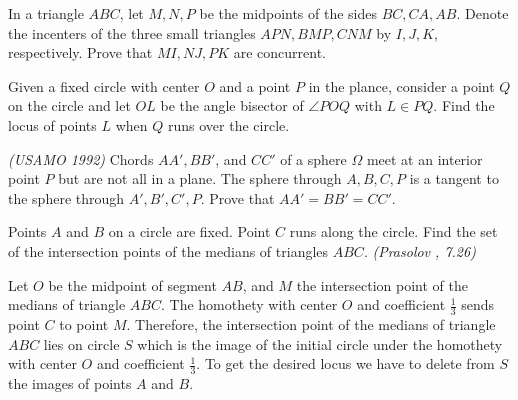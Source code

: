 \documentclass[11pt,twoside]{scrartcl}
\begin{document}
\begin{problem}
    In a triangle $ABC$, let $M, N, P$ be the midpoints of the sides $BC, CA, AB$. Denote the incenters of the three small triangles $APN, BMP, CNM$ by $I, J, K$, respectively. Prove that $MI, NJ, PK$ are concurrent.
    \begin{sketch}
        \TBD 
    \end{sketch}
\end{problem}

\begin{problem}
    Given a fixed circle with center $O$ and a point $P$ in the plance, consider a point $Q$ on the circle and let $OL$ be the angle bisector of $ \angle POQ $ with $ L \in PQ $. Find the locus of points $L$ when $Q$ runs over the circle.
    \begin{sketch}
        \TBD 
    \end{sketch}
\end{problem}

\begin{problem}
    \textit{(USAMO 1992)} Chords $AA', BB'$, and $CC'$ of a sphere $\Omega$ meet at an interior point $P$ but are not all in a plane. The sphere through $A, B, C, P$ is a tangent to the sphere through $A', B', C', P$. Prove that $AA' = BB' = CC'$.
    \begin{sketch}
        \TBD 
    \end{sketch}
\end{problem}

\begin{problem}
    Points $A$ and $B$ on a circle are fixed. Point $C$ runs along the circle. Find the set of the intersection points of the medians of triangles $ABC$. \textit{(Prasolov \cite{pgeo}, 7.26)}
    \begin{sketch}
        Let $O$ be the midpoint of segment $AB$, and $M$ the intersection point of the medians of triangle $ABC$. The homothety with center $O$ and coefficient $\frac{1}{3}$ sends point $C$ to point $M$.
        Therefore, the intersection point of the medians of triangle $ABC$ lies on circle $S$ which is
        the image of the initial circle under the homothety with center $O$ and coefficient $\frac{1}{3}$. To get the desired locus we have to delete from $S$ the images of points $A$ and $B$.
    \end{sketch}
\end{problem}
\end{document}

